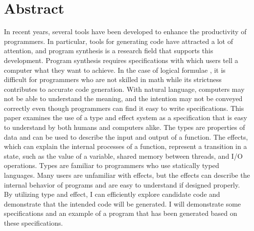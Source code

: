 \documentclass[12pt, a4paper, titlepage]{report}
\begin{document}
\chapter{Abstract} \label{chapter:abstract}
In recent years, several tools have been developed to enhance the productivity of programmers.
In particular, tools for generating code have attracted a lot of attention, and program synthesis is a research field that supports this development.
Program synthesis requires specifications with which users tell a computer what they want to achieve.
In the case of logical formulae  , it is
difficult for programmers who are not skilled in math while its strictness contributes to accurate code generation.  
With natural language, computers may not be able to understand the meaning, and the intention may not be conveyed correctly even though programmers can find it easy to write specifications.  
This paper examines the use of a type and effect system as a specification that is easy to understand by both humans and computers alike. The types are properties of data and can be used to describe the input and output of a function. The effects, which can explain the internal processes of a function, represent a transition in a state, such as the value of a variable, shared memory between threads, and I/O operations.
 
Types are familiar to programmers who use statically typed languages.
Many users are unfamiliar with effects, but the effects  can describe the internal behavior of programs  and are easy to understand if designed properly.
By utilizing type and effect, I can efficiently explore candidate code and demonstrate that the intended code will be generated. I will demonstrate some specifications and an example of a program that has been generated based on these specifications.
 
\end{document}

